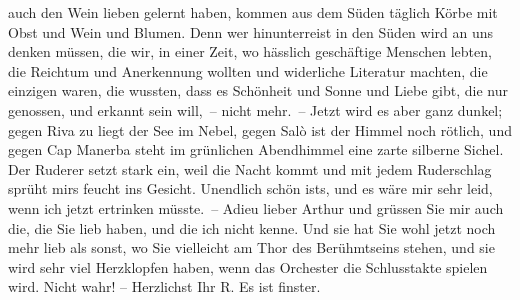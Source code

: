                auch den Wein lieben gelernt haben, kommen aus dem Süden täglich Körbe mit Obst und
               Wein und Blumen. Denn wer hinunterreist in den Süden wird an uns denken müssen, die
               wir, in einer Zeit, wo hässlich geschäftige Menschen lebten, die Reichtum und
               Anerkennung wollten und widerliche Literatur machten, die einzigen waren, die
               wussten, dass es Schönheit und Sonne und Liebe gibt, die nur genossen, und erkannt
               sein will, – nicht mehr. – Jetzt wird es aber ganz dunkel; gegen Riva zu liegt der See im Nebel, gegen Salò ist der Himmel noch rötlich, und gegen Cap Manerba steht im grünlichen Abendhimmel eine zarte silberne
                  {\pb}Sichel. Der Ruderer setzt stark ein, weil die
               Nacht kommt und mit jedem Ruderschlag sprüht mirs feucht ins Gesicht. Unendlich schön
               ists, und es wäre mir sehr leid, wenn ich jetzt ertrinken müsste. – Adieu lieber
               Arthur und grüssen Sie mir auch die, die Sie lieb haben, und die ich nicht kenne. Und
               sie hat Sie wohl jetzt noch mehr lieb als sonst, wo Sie vielleicht am Thor des
               Berühmtseins stehen, und sie wird sehr viel Herzklopfen haben, wenn das Orchester die
               Schlusstakte spielen wird. Nicht wahr! – Herzlichst Ihr\pend
           \pstart \spacefill\mbox{R.}\pend{}
\pstart
           \noindent{}Es ist finster.\pend
           \endnumbering{}  
      